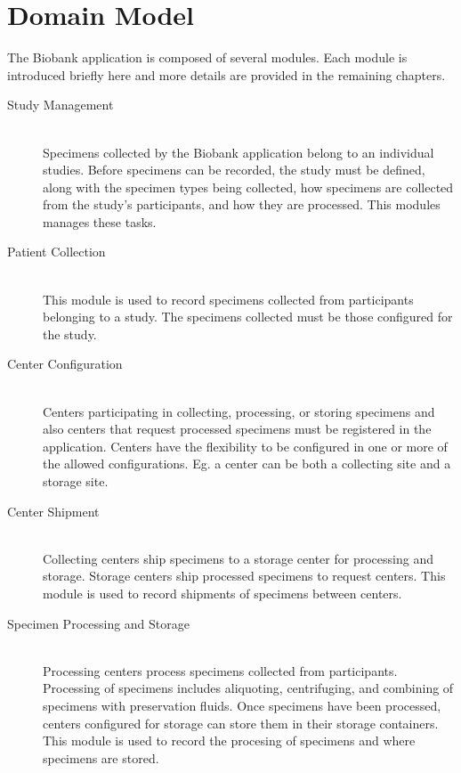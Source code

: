 \chapter{Domain Model}

The Biobank application is composed of several modules. Each module is
introduced briefly here and more details are provided in the remaining
chapters.

\begin{description}

  \item[Study Management] \hfill \\ Specimens collected by the Biobank
    application belong to an individual studies. Before specimens can be
    recorded, the study must be defined, along with the specimen types being
    collected, how specimens are collected from the study's participants, and
    how they are processed. This modules manages these tasks.

  \item[Patient Collection] \hfill \\ This module is used to record specimens
    collected from participants belonging to a study. The specimens collected
    must be those configured for the study.

  \item[Center Configuration] \hfill \\ Centers participating in collecting,
    processing, or storing specimens and also centers that request processed
    specimens must be registered in the application. Centers have the
    flexibility to be configured in one or more of the allowed
    configurations. Eg. a center can be both a collecting site and a storage
    site.

  \item[Center Shipment] \hfill \\ Collecting centers ship specimens to a
    storage center for processing and storage. Storage centers ship processed
    specimens to request centers. This module is used to record shipments of
    specimens between centers.

  \item[Specimen Processing and Storage] \hfill \\ Processing centers process
    specimens collected from participants. Processing of specimens includes
    aliquoting, centrifuging, and combining of specimens with preservation
    fluids.  Once specimens have been processed, centers configured for storage
    can store them in their storage containers. This module is used to record
    the procesing of specimens and where specimens are stored.


\end{description}
